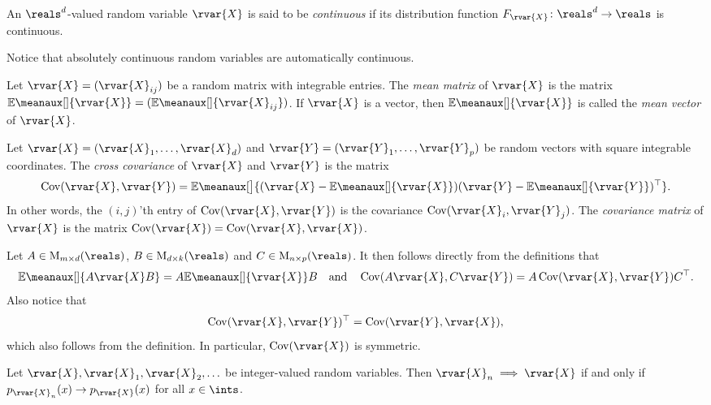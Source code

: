 \documentclass[article, a4paper, 11pt, oneside]{memoir}
\numberwithin{equation}{chapter}
\begin{document}
\begin{definition}
    An $\reals^d$-valued random variable $\rvar{X}$ is said to be \emph{continuous} if its distribution function $F_{\rvar{X}} \colon \reals^d \to \reals$ is continuous.
\end{definition}
%
Notice that absolutely continuous random variables are automatically continuous.

\newcommand{\mat}{\mathrm{M}}
\newcommand{\trans}{^{\top}}
\newcommand{\cov}{\operatorname{Cov}}
\renewcommand{\mean}[2][]{\mathbb{E}\meanaux[#1]{#2}}

\begin{definition}
    Let $\rvar{X} = (\rvar{X}_{ij})$ be a random matrix with integrable entries. The \emph{mean matrix} of $\rvar{X}$ is the matrix $\mean{\rvar{X}} = (\mean{\rvar{X}_{ij}})$. If $\rvar{X}$ is a vector, then $\mean{\rvar{X}}$ is called the \emph{mean vector} of $\rvar{X}$.

    Let $\rvar{X} = (\rvar{X}_1, \ldots, \rvar{X}_d)$ and $\rvar{Y} = (\rvar{Y}_1, \ldots, \rvar{Y}_p)$ be random vectors with square integrable coordinates. The \emph{cross covariance} of $\rvar{X}$ and $\rvar{Y}$ is the matrix
    \begin{equation*}
        \cov(\rvar{X},\rvar{Y})
            = \mean[\big]{ (\rvar{X} - \mean{\rvar{X}}) (\rvar{Y} - \mean{\rvar{Y}})\trans }.
    \end{equation*}
    In other words, the $(i,j)$'th entry of $\cov(\rvar{X},\rvar{Y})$ is the covariance $\cov(\rvar{X}_i,\rvar{Y}_j)$. The \emph{covariance matrix} of $\rvar{X}$ is the matrix $\cov(\rvar{X}) = \cov(\rvar{X},\rvar{X})$.
\end{definition}
%
Let $A \in \mat_{m \times d}(\reals)$, $B \in \mat_{d \times k}(\reals)$ and $C \in \mat_{n \times p}(\reals)$. It then follows directly from the definitions that
%
\begin{equation}
    \label{eq:mean-cov-matrix-property}
    \mean{A\rvar{X}B}
        = A \mean{\rvar{X}} B
    \quad \text{and} \quad
    \cov(A\rvar{X}, C\rvar{Y})
        = A \cov(\rvar{X}, \rvar{Y}) C\trans.
\end{equation}
%
Also notice that
%
\begin{equation*}
    \cov(\rvar{X}, \rvar{Y})\trans
        = \cov(\rvar{Y}, \rvar{X}),
\end{equation*}
%
which also follows from the definition. In particular, $\cov(\rvar{X})$ is symmetric.


\begin{proposition}
    Let $\rvar{X}, \rvar{X}_1, \rvar{X}_2, \ldots$ be integer-valued random variables. Then $\rvar{X}_n \implies \rvar{X}$ if and only if $p_{\rvar{X}_n}(x) \to p_{\rvar{X}}(x)$ for all $x \in \ints$.
\end{proposition}
\end{document}

